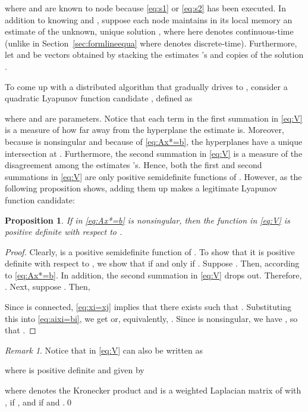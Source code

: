 \documentclass[11pt]{article}
\theoremstyle{plain}
\newtheorem{proposition}{Proposition}
\theoremstyle{definition}
\theoremstyle{remark}
\newtheorem{remark}{Remark}
\begin{document}
where  and  are known to node  because \eqref{eq:s1} or \eqref{eq:s2} has been executed. In addition to knowing  and , suppose each node  maintains in its local memory an estimate  of the unknown, unique solution , where here  denotes continuous-time (unlike in Section~\ref{sec:formlineequa} where  denotes discrete-time). Furthermore, let  and  be vectors obtained by stacking the  estimates 's and  copies of the solution .

To come up with a distributed algorithm that gradually drives  to , consider a quadratic Lyapunov function candidate , defined as

where   and   are parameters. Notice that each term in the first summation in \eqref{eq:V} is a measure of how far away from the hyperplane  the estimate  is. Moreover, because  is nonsingular and because of \eqref{eq:Ax*=b}, the  hyperplanes   have a unique intersection at . Furthermore, the second summation in \eqref{eq:V} is a measure of the disagreement among the estimates 's. Hence, both the first and second summations in \eqref{eq:V} are only positive semidefinite functions of . However, as the following proposition shows, adding them up makes  a legitimate Lyapunov function candidate:

\begin{proposition}\label{pro:AVpd}
If  in \eqref{eq:Ax*=b} is nonsingular, then the function  in \eqref{eq:V} is positive definite with respect to .
\end{proposition}

\begin{proof}
Clearly,  is a positive semidefinite function of . To show that it is positive definite with respect to , we show that  if and only if . Suppose . Then,   according to \eqref{eq:Ax*=b}. In addition, the second summation in \eqref{eq:V} drops out. Therefore, . Next, suppose . Then,

Since  is connected, \eqref{eq:xi=xj} implies that there exists  such that  . Substituting this into \eqref{eq:aixi=bi}, we get   or, equivalently, . Since  is nonsingular, we have , so that .
\end{proof}

\begin{remark}\label{rem:V}
Notice that  in \eqref{eq:V} can also be written as

where  is positive definite and given by

where  denotes the Kronecker product and  is a weighted Laplacian matrix of  with ,  if , and  if  and .\qed
\end{remark}
\end{document}
